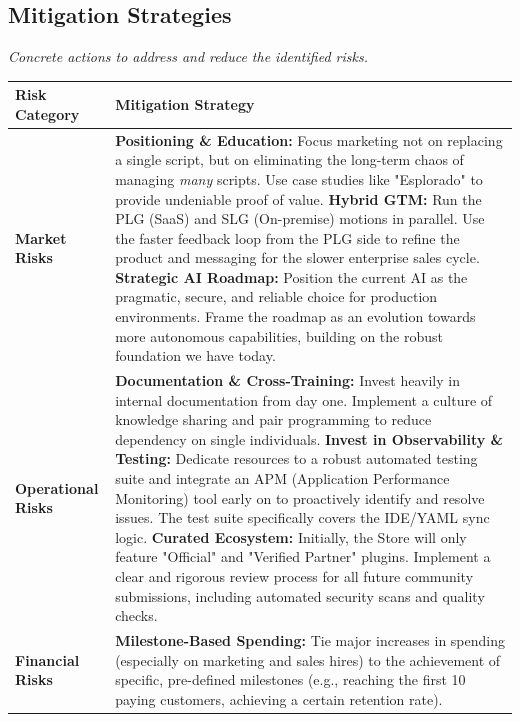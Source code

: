 \documentclass[11pt, a4paper, oneside]{article}
\begin{document}
\newpage
\subsection{Mitigation Strategies}
\textit{Concrete actions to address and reduce the identified risks.}

\begin{table}[H]
\centering
\begin{tabularx}{\textwidth}{@{}lL@{}}
\toprule
\textbf{Risk Category} & \textbf{Mitigation Strategy} \\
\midrule
\textbf{Market Risks} & 
\textbf{Positioning \& Education:} Focus marketing not on replacing a single script, but on eliminating the long-term chaos of managing \textit{many} scripts. Use case studies like "Esplorado" to provide undeniable proof of value. \newline\newline
\textbf{Hybrid GTM:} Run the PLG (SaaS) and SLG (On-premise) motions in parallel. Use the faster feedback loop from the PLG side to refine the product and messaging for the slower enterprise sales cycle. \newline\newline
\textbf{Strategic AI Roadmap:} Position the current AI as the pragmatic, secure, and reliable choice for production environments. Frame the roadmap as an evolution towards more autonomous capabilities, building on the robust foundation we have today. \\
\addlinespace
\textbf{Operational Risks} & 
\textbf{Documentation \& Cross-Training:} Invest heavily in internal documentation from day one. Implement a culture of knowledge sharing and pair programming to reduce dependency on single individuals. \newline\newline
\textbf{Invest in Observability \& Testing:} Dedicate resources to a robust automated testing suite and integrate an APM (Application Performance Monitoring) tool early on to proactively identify and resolve issues. The test suite specifically covers the IDE/YAML sync logic. \newline\newline
\textbf{Curated Ecosystem:} Initially, the Store will only feature "Official" and "Verified Partner" plugins. Implement a clear and rigorous review process for all future community submissions, including automated security scans and quality checks. \\
\addlinespace
\textbf{Financial Risks} & 
\textbf{Milestone-Based Spending:} Tie major increases in spending (especially on marketing and sales hires) to the achievement of specific, pre-defined milestones (e.g., reaching the first 10 paying customers, achieving a certain retention rate). \newline\newline

\end{tabularx}
\end{table}
\end{document}
